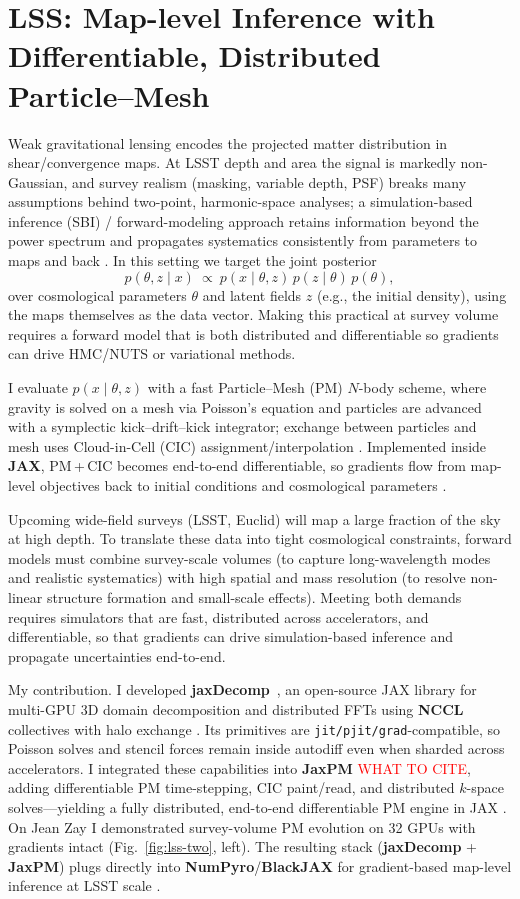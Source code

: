 \documentclass{article}
\newcommand{\wk}[1]{\textcolor{red}{#1}}
\begin{document}
\section*{LSS: Map-level Inference with Differentiable, Distributed Particle–Mesh}
Weak gravitational lensing encodes the projected matter distribution in shear/convergence maps. At LSST depth and area the signal is markedly non-Gaussian, and survey realism (masking, variable depth, PSF) breaks many assumptions behind two-point, harmonic-space analyses; a simulation-based inference (SBI) / forward-modeling approach retains information beyond the power spectrum and propagates systematics consistently from parameters to maps and back \citep{Cranmer2020SBI}. In this setting we target the joint posterior
\[
p(\theta, z \mid x)\ \propto\ p(x\mid \theta, z)\,p(z\mid \theta)\,p(\theta),
\]
over cosmological parameters \(\theta\) and latent fields \(z\) (e.g., the initial density), using the maps themselves as the data vector. Making this practical at survey volume requires a forward model that is both distributed and differentiable so gradients can drive HMC/NUTS or variational methods.

I evaluate \(p(x\mid\theta,z)\) with a fast Particle–Mesh (PM) \(N\)-body scheme, where gravity is solved on a mesh via Poisson’s equation and particles are advanced with a symplectic kick–drift–kick integrator; exchange between particles and mesh uses Cloud-in-Cell (CIC) assignment/interpolation \citep{HockneyEastwood1988}. Implemented inside \textbf{JAX}, PM\,+\,CIC becomes end-to-end differentiable, so gradients flow from map-level objectives back to initial conditions and cosmological parameters \citep{Bradbury2018JAX}.

Upcoming wide-field surveys (LSST, Euclid) will map a large fraction of the sky at high depth. To translate these data into tight cosmological constraints, forward models must combine survey-scale volumes (to capture long-wavelength modes and realistic systematics) with high spatial and mass resolution (to resolve non-linear structure formation and small-scale effects). Meeting both demands requires simulators that are fast, distributed across accelerators, and differentiable, so that gradients can drive simulation-based inference and propagate uncertainties end-to-end.

My contribution. I developed \textbf{jaxDecomp}~\citep{jaxDecomp}, an open-source JAX library for multi-GPU 3D domain decomposition and distributed FFTs using \textbf{NCCL} collectives with halo exchange \citep{NCCL}. Its primitives are \verb|jit/pjit/grad|-compatible, so Poisson solves and stencil forces remain inside autodiff even when sharded across accelerators. I integrated these capabilities into \textbf{JaxPM} \wk{WHAT TO CITE}, adding differentiable PM time-stepping, CIC paint/read, and distributed \(k\)-space solves—yielding a fully distributed, end-to-end differentiable PM engine in JAX \citep{Bradbury2018JAX}. On Jean Zay I demonstrated survey-volume PM evolution on 32 GPUs with gradients intact (Fig.~\ref{fig:lss-two}, left). The resulting stack (\textbf{jaxDecomp} + \textbf{JaxPM}) plugs directly into \textbf{NumPyro}/\textbf{BlackJAX} for gradient-based map-level inference at LSST scale \citep{NumPyro,BlackJAX}.
\end{document}
